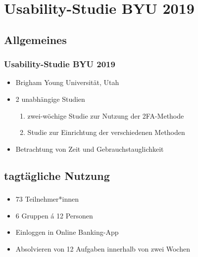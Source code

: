 \section{Usability-Studie BYU 2019}

\subsection*{Allgemeines}
\begin{frame}
    \frametitle{Usability-Studie BYU 2019}

    \begin{itemize}
        \item Brigham Young Universität, Utah
        \item 2 unabhängige Studien
              \begin{enumerate}
                  \item zwei-wöchige Studie zur Nutzung der 2FA-Methode
                  \item Studie zur Einrichtung der verschiedenen Methoden
              \end{enumerate}
        \item Betrachtung von Zeit und Gebrauchstauglichkeit
    \end{itemize}

    \note{
        \ldots
    }

\end{frame}

\subsection{tagtägliche Nutzung}
\begin{frame}
    \frametitle{\currentsectionname}

    \begin{itemize}
        \item 73 Teilnehmer*innen
        \item 6 Gruppen \'{a} 12 Personen
        \item Einloggen in Online Banking-App
        \item Absolvieren von 12 Aufgaben innerhalb von zwei Wochen
    \end{itemize}


\end{frame}

